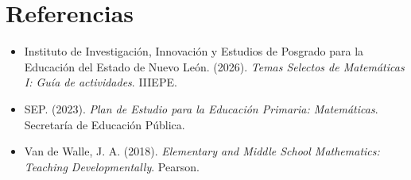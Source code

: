 \documentclass[spanish,letterpaper,oneside]{article}
\begin{document}
\section{Referencias}

\begin{itemize}
  \item Instituto de Investigación, Innovación y Estudios de Posgrado para la Educación del Estado de Nuevo León. (2026). \textit{Temas Selectos de Matemáticas I: Guía de actividades}. IIIEPE.
  \item SEP. (2023). \textit{Plan de Estudio para la Educación Primaria: Matemáticas}. Secretaría de Educación Pública.
  \item Van de Walle, J. A. (2018). \textit{Elementary and Middle School Mathematics: Teaching Developmentally}. Pearson.
\end{itemize}
\end{document}
